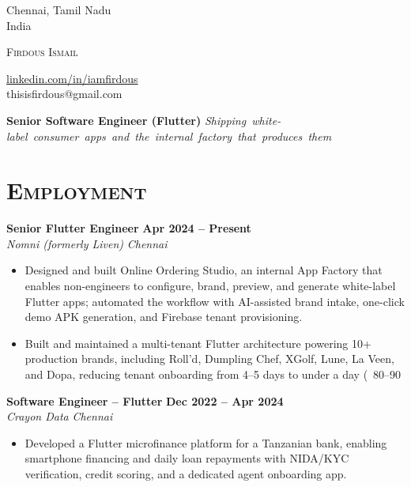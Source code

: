\documentclass[10.5pt]{article}
\newcommand{\role}[4]{%
  \noindent\textbf{#1} \hfill \textbf{#3}\\
  {\itshape #2} \hfill {\itshape #4}\par
}
\begin{document}
\noindent
\begin{minipage}[t]{0.33\textwidth}
Chennai, Tamil Nadu\\
India
\end{minipage}%
\begin{minipage}[t]{0.34\textwidth}
\centering
{\scshape\Large Firdous Ismail}
\end{minipage}%
\begin{minipage}[t]{0.33\textwidth}
\raggedleft
\href{https://linkedin.com/in/iamfirdous}{linkedin.com/in/iamfirdous}\\
thisisfirdous@gmail.com
\end{minipage}

\vspace{2pt}
\noindent\textbf{Senior Software Engineer (Flutter)} \hfill \mbox{\textit{Shipping white-label consumer apps and the internal factory that produces them}}

\section*{\scshape Employment}

\role{Senior Flutter Engineer}{Nomni (formerly Liven)}{Apr 2024 -- Present}{Chennai}
\begin{itemize}
\item Designed and built Online Ordering Studio, an internal App Factory that enables non-engineers to configure, brand, preview, and generate white-label Flutter apps; automated the workflow with AI-assisted brand intake, one-click demo APK generation, and Firebase tenant provisioning.
\item Built and maintained a multi-tenant Flutter architecture powering 10+ production brands, including Roll'd, Dumpling Chef, XGolf, Lune, La Veen, and Dopa, reducing tenant onboarding from 4–5 days to under a day (~80–90%
\end{itemize}

\vspace{2pt}
\role{Software Engineer -- Flutter}{Crayon Data}{Dec 2022 -- Apr 2024}{Chennai}
\begin{itemize}
\item Developed a Flutter microfinance platform for a Tanzanian bank, enabling smartphone financing and daily loan repayments with NIDA/KYC verification, credit scoring, and a dedicated agent onboarding app.
\end{itemize}
\end{document}
